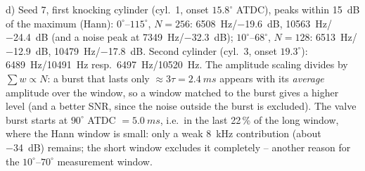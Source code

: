 \begin{solution}
d) Seed 7, first knocking cylinder (cyl.~1, onset $15.8^\circ$ ATDC), peaks within
\SI{15}{dB} of the maximum (Hann):
$0^\circ$--$115^\circ$, $N=256$: \SI{6508}{Hz}/\SI{-19.6}{dB}, \SI{10563}{Hz}/\SI{-24.4}{dB}
(and a noise peak at \SI{7349}{Hz}/\SI{-32.3}{dB});
$10^\circ$--$68^\circ$, $N=128$: \SI{6513}{Hz}/\SI{-12.9}{dB}, \SI{10479}{Hz}/\SI{-17.8}{dB}.
Second cylinder (cyl.~3, onset $19.3^\circ$): \SI{6489}{Hz}/\SI{10491}{Hz} resp.\
\SI{6497}{Hz}/\SI{10520}{Hz}. The amplitude scaling divides by $\sum w\propto N$:
a burst that lasts only $\approx3\tau=\SI{2.4}{ms}$ appears with its \emph{average}
amplitude over the window, so a window matched to the burst gives a higher level
(and a better SNR, since the noise outside the burst is excluded). The valve
burst starts at $90^\circ$ ATDC $=\SI{5.0}{ms}$, i.e.\ in the last 22\,\% of the long
window, where the Hann window is small: only a weak \SI{8}{kHz} contribution
(about \SI{-34}{dB}) remains; the short window excludes it completely --
another reason for the $10^\circ$--$70^\circ$ measurement window.
\end{solution}

